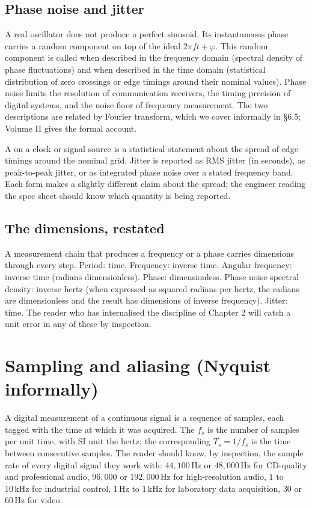 \subsection{Phase noise and jitter}

A real oscillator does not produce a perfect sinusoid. Its
instantaneous phase carries a random component on top of the
ideal $2\pi f t + \varphi$. This random component is called
 when described in the frequency domain
(spectral density of phase fluctuations) and  when
described in the time domain (statistical distribution of zero
crossings or edge timings around their nominal values). Phase noise
limits the resolution of communication receivers, the timing
precision of digital systems, and the noise floor of frequency
measurement. The two descriptions are related by Fourier transform,
which we cover informally in \S 6.5; Volume II gives the formal
account.

A  on a clock or signal source is a
statistical statement about the spread of edge timings around the
nominal grid. Jitter is reported as RMS jitter (in seconds), as
peak-to-peak jitter, or as integrated phase noise over a stated
frequency band. Each form makes a slightly different claim about
the spread; the engineer reading the spec sheet should know which
quantity is being reported.

\subsection{The dimensions, restated}

A measurement chain that produces a frequency or a phase carries
dimensions through every step. Period: time. Frequency: inverse
time. Angular frequency: inverse time (radians dimensionless).
Phase: dimensionless. Phase noise spectral density: inverse hertz
(when expressed as squared radians per hertz, the radians are
dimensionless and the result has dimensions of inverse frequency).
Jitter: time. The reader who has internalised the discipline of
Chapter 2 will catch a unit error in any of these by inspection.

\section{Sampling and aliasing (Nyquist informally)}

A digital measurement of a continuous signal is a sequence of
samples, each tagged with the time at which it was acquired. The
 $f_{s}$ is the number of samples per unit
time, with SI unit the hertz; the corresponding  $T_{s} = 1/f_{s}$ is the time between consecutive samples.
The reader should know, by inspection, the sample rate of every
digital signal they work with: $44{,}100 \,\si{\hertz}$ or $48{,}000
\,\si{\hertz}$ for CD-quality and professional audio, $96{,}000$ or
$192{,}000 \,\si{\hertz}$ for high-resolution audio, $1$ to $10 \,\si
{\kilo\hertz}$ for industrial control, $1 \,\si{\hertz}$ to $1 \,\si
{\kilo\hertz}$ for laboratory data acquisition, $30$ or $60 \,\si
{\hertz}$ for video.

